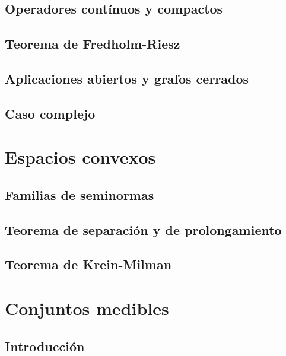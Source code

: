 \documentclass[12pt,]{krantz}
\theoremstyle{definition}
\theoremstyle{definition}
\theoremstyle{definition}
\theoremstyle{remark}
\begin{document}
\section{Operadores contínuos y
compactos}\label{operadores-continuos-y-compactos-1}

\section{Teorema de Fredholm-Riesz}\label{teorema-de-fredholm-riesz}

\section{Aplicaciones abiertos y grafos
cerrados}\label{aplicaciones-abiertos-y-grafos-cerrados}

\section{Caso complejo}\label{caso-complejo}

\chapter{Espacios convexos}\label{espacios-convexos}

\section{Familias de seminormas}\label{familias-de-seminormas}

\section{Teorema de separación y de
prolongamiento}\label{teorema-de-separacion-y-de-prolongamiento}

\section{Teorema de Krein-Milman}\label{teorema-de-krein-milman}

\chapter{Conjuntos medibles}\label{conjuntos-medibles}

\section{Introducción}\label{introduccion-2}
\end{document}
